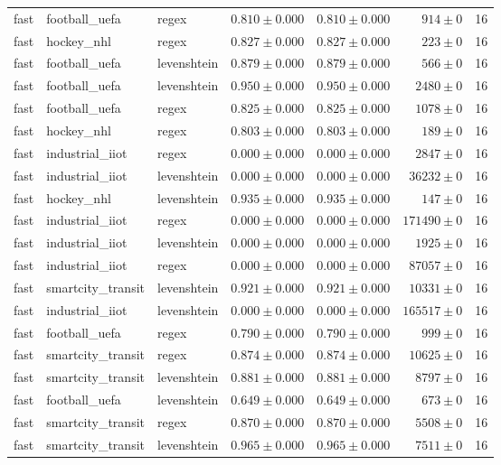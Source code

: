 \begin{table}[htbp]
\begin{tabular}{l l l r r r r}
fast & football\_uefa & regex & $0.810\pm0.000$ & $0.810\pm0.000$ & $914\pm0$ & 16 \\
fast & hockey\_nhl & regex & $0.827\pm0.000$ & $0.827\pm0.000$ & $223\pm0$ & 16 \\
fast & football\_uefa & levenshtein & $0.879\pm0.000$ & $0.879\pm0.000$ & $566\pm0$ & 16 \\
fast & football\_uefa & levenshtein & $0.950\pm0.000$ & $0.950\pm0.000$ & $2480\pm0$ & 16 \\
fast & football\_uefa & regex & $0.825\pm0.000$ & $0.825\pm0.000$ & $1078\pm0$ & 16 \\
fast & hockey\_nhl & regex & $0.803\pm0.000$ & $0.803\pm0.000$ & $189\pm0$ & 16 \\
fast & industrial\_iiot & regex & $0.000\pm0.000$ & $0.000\pm0.000$ & $2847\pm0$ & 16 \\
fast & industrial\_iiot & levenshtein & $0.000\pm0.000$ & $0.000\pm0.000$ & $36232\pm0$ & 16 \\
fast & hockey\_nhl & levenshtein & $0.935\pm0.000$ & $0.935\pm0.000$ & $147\pm0$ & 16 \\
fast & industrial\_iiot & regex & $0.000\pm0.000$ & $0.000\pm0.000$ & $171490\pm0$ & 16 \\
fast & industrial\_iiot & levenshtein & $0.000\pm0.000$ & $0.000\pm0.000$ & $1925\pm0$ & 16 \\
fast & industrial\_iiot & regex & $0.000\pm0.000$ & $0.000\pm0.000$ & $87057\pm0$ & 16 \\
fast & smartcity\_transit & levenshtein & $0.921\pm0.000$ & $0.921\pm0.000$ & $10331\pm0$ & 16 \\
fast & industrial\_iiot & levenshtein & $0.000\pm0.000$ & $0.000\pm0.000$ & $165517\pm0$ & 16 \\
fast & football\_uefa & regex & $0.790\pm0.000$ & $0.790\pm0.000$ & $999\pm0$ & 16 \\
fast & smartcity\_transit & regex & $0.874\pm0.000$ & $0.874\pm0.000$ & $10625\pm0$ & 16 \\
fast & smartcity\_transit & levenshtein & $0.881\pm0.000$ & $0.881\pm0.000$ & $8797\pm0$ & 16 \\
fast & football\_uefa & levenshtein & $0.649\pm0.000$ & $0.649\pm0.000$ & $673\pm0$ & 16 \\
fast & smartcity\_transit & regex & $0.870\pm0.000$ & $0.870\pm0.000$ & $5508\pm0$ & 16 \\
fast & smartcity\_transit & levenshtein & $0.965\pm0.000$ & $0.965\pm0.000$ & $7511\pm0$ & 16 \\

\end{tabular}
\end{table}
